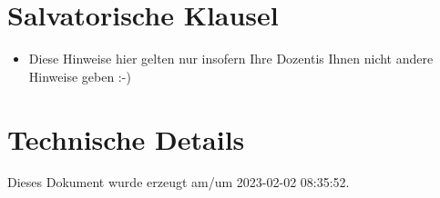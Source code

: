 \documentclass[
  a4paper,
  DIV=11]{scrreprt}
\providecommand{\tightlist}{%
  \setlength{\itemsep}{0pt}\setlength{\parskip}{0pt}}\usepackage{longtable,booktabs,array}
\theoremstyle{definition}
\theoremstyle{definition}
\theoremstyle{remark}
\begin{document}
\hypertarget{salvatorische-klausel}{%
\section*{Salvatorische Klausel}\label{salvatorische-klausel}}


\begin{itemize}
\tightlist
\item
  Diese Hinweise hier gelten nur insofern Ihre Dozentis Ihnen nicht
  andere Hinweise geben :-)
\end{itemize}

\hypertarget{technische-details}{%
\section*{Technische Details}\label{technische-details}}


Dieses Dokument wurde erzeugt am/um 2023-02-02 08:35:52.
\end{document}
